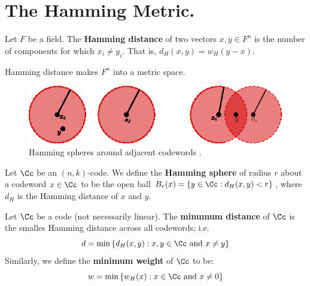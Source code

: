 
\section{The Hamming Metric.}
\label{section1}

\begin{definition}
    Let $F$ be a field. The  \textbf{Hamming distance} of two vectors $x,y \in
    F^n$ is the number of components for which  $x_i \neq y_i$. That is,
    $d_H(x,y)=w_H(y-x)$.
\end{definition}

\begin{lemma}\label{2.3.1}
    Hamming distance makes $F^n$ into a metric space.
\end{lemma}

\begin{figure}[h]
    \centering
    \includegraphics[scale=1.0]{Figures/Chapter2/hamming_spheres.eps}
    \caption{Hamming spheres around adjacent codewords \cite{mceliece}.}
    \label{fig_2.1}
\end{figure}

\begin{definition}
    Let $\Cc$ be an $(n,k)$-code. We define the \textbf{Hamming sphere} of
    radius $r$ about a codeword  $x \in \Cc$ to be the open ball  $B_r(x)=\{y
    \in \Cc : d_H(x,y)<r\}$, where $d_H$ is the Hamming distance of  $x$ and
    $y$.
\end{definition}

\begin{definition}
    Let $\Cc$ be a code  (not necessarily linear). The \textbf{minumum distance}
    of $\Cc$ is the smalles Hamming distance across all codewords; i.e.
    \begin{equation}
        d=\min{\{d_H(x,y) : x,y \in \Cc \text{ and } x \neq y\}}
    \end{equation}
    Similarly, we define the \textbf{minimum weight} of $\Cc$ to be:
    \begin{equation}
        w=\min{\{w_H(x) : x \in \Cc \text{ and } x \neq 0\}}
    \end{equation}
\end{definition}

